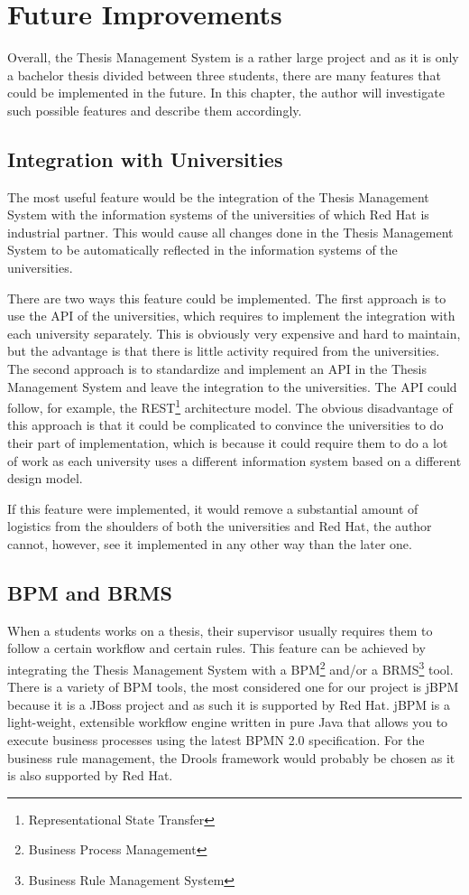 \chapter{Future Improvements}

Overall, the Thesis Management System is a rather large project and as it is only a bachelor thesis divided between three students, there are many features that could be implemented in the future. In this chapter, the author will investigate such possible features and describe them accordingly.

\section{Integration with Universities}

The most useful feature would be the integration of the Thesis Management System with the information systems of the universities of which Red Hat is industrial partner. This would cause all changes done in the Thesis Management System to be automatically reflected in the information systems of the universities. 

There are two ways this feature could be implemented. The first approach is to use the API of the universities, which requires to implement the integration with each university separately. This is obviously very expensive and hard to maintain, but the advantage is that there is little activity required from the universities. The second approach is to standardize and implement an API in the Thesis Management System and leave the integration to the universities. The API could follow, for example, the REST\footnote{Representational State Transfer} architecture model. The obvious disadvantage of this approach is that it could be complicated to convince the universities to do their part of implementation, which is because it could require them to do a lot of work as each university uses a different information system based on a different design model. 

If this feature were implemented, it would remove a substantial amount of logistics from the shoulders of both the universities and Red Hat, the author cannot, however, see it implemented in any other way than the later one.

\section{BPM and BRMS}

When a students works on a thesis, their supervisor usually requires them to follow a certain workflow and certain rules. This feature can be achieved by integrating the Thesis Management System with a BPM\footnote{Business Process Management} and/or a BRMS\footnote{Business Rule Management System} tool. There is a variety of BPM tools, the most considered one for our project is jBPM because it is a JBoss project and as such it is supported by Red Hat. jBPM is a light-weight, extensible workflow engine written in pure Java that allows you to execute business processes using the latest BPMN 2.0 specification\cite{jbpm-homepage}. For the business rule management, the Drools framework would probably be chosen as it is also supported by Red Hat\cite{drools-homepage}. 

